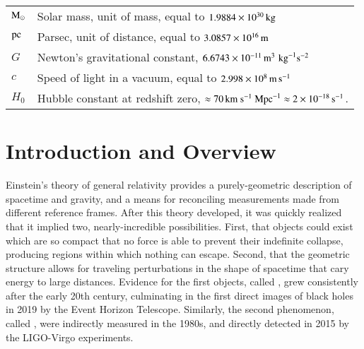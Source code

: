\documentclass[onecolumn,authoryear]{els-mrw}
\begin{document}
    \begin{glossary}
    \begin{tabular}{@{}lp{34pc}@{}}
    $\textrm{M}_{\odot}$ & Solar mass, unit of mass, equal to $1.9884\times\nobreak10^{30} \, \mathrm{kg}$ \\
    $\mathrm{pc}$ & Parsec, unit of distance, equal to $3.0857\times\nobreak10^{16} \, \mathrm{m}$ \\
    $G$ & Newton's gravitational constant, $6.6743\times\nobreak10^{{-11}} \, \mathrm{m}^3 \, \, \mathrm{kg}^{-1} \mathrm{s}^{-2}$ \\
    $c$ & Speed of light in a vacuum, equal to $2.998\times\nobreak10^{8} \, \mathrm{m} \, \mathrm{s}^{-1}$ \\
    $H_0$ & Hubble constant at redshift zero, $\approx 70 \, \textrm{km}~\textrm{s}^{-1}~\textrm{Mpc}^{-1} \approx 2\times\nobreak10^{-18} \, \mathrm{s}^{-1}$.
    \end{tabular}
    \end{glossary}







\section{Introduction and Overview}\label{sec:intro}

Einstein's theory of general relativity provides a purely-geometric description of spacetime and gravity, and a means for reconciling measurements made from different reference frames.  After this theory developed, it was quickly realized that it implied two, nearly-incredible possibilities.  First, that objects could exist which are so compact that no force is able to prevent their indefinite collapse, producing regions within which nothing can escape.  Second, that the geometric structure allows for traveling perturbations in the shape of spacetime that cary energy to large distances.  Evidence for the first objects, called , grew consistently after the early 20th century, culminating in the first direct images of black holes in 2019 by the Event Horizon Telescope.  Similarly, the second phenomenon, called , were indirectly measured in the 1980s, and directly detected in 2015 by the LIGO-Virgo experiments.
\end{document}
